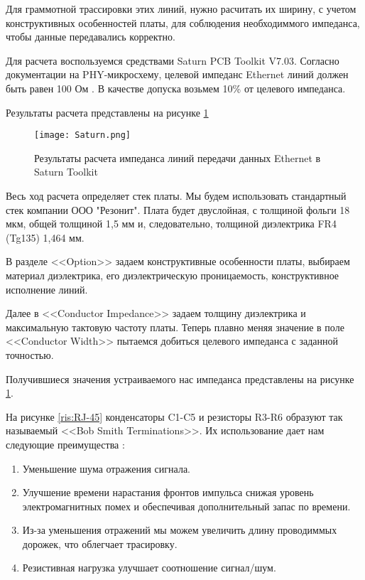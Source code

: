 Для граммотной трассировки этих линий, нужно расчитать их ширину, с учетом конструктивных особенностей 
платы, для соблюдения необходиммого импеданса, чтобы данные передавались корректно. 

Для расчета воспользуемся средствами Saturn PCB Toolkit V7.03. Согласно документации на PHY-микросхему,
целевой импеданс Ethernet линий должен быть равен 100 Ом \cite{DP83848:datasheet}. В качестве допуска 
возьмем 10\% от целевого импеданса. 

Результаты расчета представлены на рисунке \ref{ris:Saturn}

\begin{figure}[H]
\centering
\texttt{[image: Saturn.png]}
\caption{Результаты расчета импеданса линий передачи данных Ethernet в Saturn Toolkit}
\label{ris:Saturn}
\end{figure}

 Весь ход расчета определяет стек платы. Мы будем использовать стандартный стек компании ООО "Резонит". 
 Плата будет двуслойная, с толщиной фольги 18 мкм, общей толщиной 1,5 мм и, следовательно, толщиной 
 диэлектрика FR4 (Tg135) 1,464 мм. 

 В разделе <<Option>> задаем конструктивные особенности платы, выбираем материал диэлектрика, его 
 диэлектрическую проницаемость, конструктивное исполнение линий. 

 Далее в <<Conductor Impedance>> задаем толщину диэлектрика и максимальную тактовую частоту платы. Теперь 
 плавно меняя значение в поле <<Conductor Width>> пытаемся добиться целевого импеданса с заданной точностью. 

 Получившиеся значения устраиваемого нас импеданса представлены на рисунке \ref{ris:Saturn}. 
 
На рисунке \ref{ris:RJ-45} конденсаторы C1-C5 и резисторы R3-R6 образуют так называемый <<Bob Smith Terminations>>. 
Их использование дает нам следующие преимущества \cite{Bob Smith terminator}:

\begin{enumerate}
    \item Уменьшение шума отражения сигнала.
    \item Улучшение времени нарастания фронтов импульса снижая уровень электромагнитных помех 
    и обеспечивая дополнительный запас по времени.
    \item Из-за уменьшения отражений мы можем увеличить длину проводиммых дорожек, что облегчает трасировку.
    \item Резистивная нагрузка улучшает соотношение сигнал/шум.
\end{enumerate}

